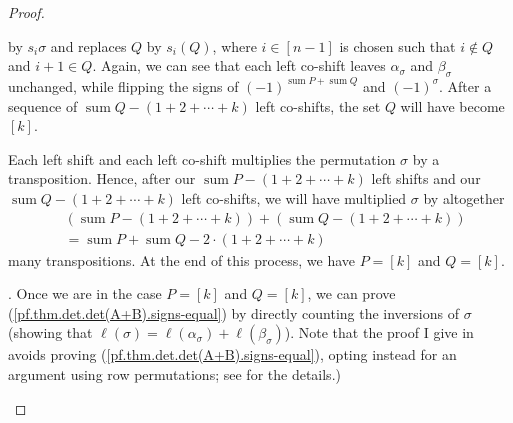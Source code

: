 \begin{proof}
\begin{fineprint}
{by $s_{i}\sigma$ and replaces $Q$ by $s_{i}\left(  Q\right)  $, where
$i\in\left[  n-1\right]  $ is chosen such that $i\notin Q$ and $i+1\in Q$.
Again, we can see that each left co-shift leaves $\alpha_{\sigma}$ and
$\beta_{\sigma}$ unchanged, while flipping the signs of $\left(  -1\right)
^{\operatorname*{sum}P+\operatorname*{sum}Q}$ and $\left(  -1\right)
^{\sigma}$. After a sequence of $\operatorname*{sum}Q-\left(  1+2+\cdots
+k\right)  $ left co-shifts, the set $Q$ will have become $\left[  k\right]
$.
\par
Each left shift and each left co-shift multiplies the permutation $\sigma$ by
a transposition. Hence, after our $\operatorname*{sum}P-\left(  1+2+\cdots
+k\right)  $ left shifts and our $\operatorname*{sum}Q-\left(  1+2+\cdots
+k\right)  $ left co-shifts, we will have multiplied $\sigma$ by altogether%
\begin{align*}
&  \left(  \operatorname*{sum}P-\left(  1+2+\cdots+k\right)  \right)  +\left(
\operatorname*{sum}Q-\left(  1+2+\cdots+k\right)  \right) \\
&  =\operatorname*{sum}P+\operatorname*{sum}Q-2\cdot\left(  1+2+\cdots
+k\right)
\end{align*}
many transpositions. At the end of this process, we have $P=\left[  k\right]
$ and $Q=\left[  k\right]  $.}. Once we are in the case $P=\left[  k\right]  $
and $Q=\left[  k\right]  $, we can prove
(\ref{pf.thm.det.det(A+B).signs-equal}) by directly counting the inversions of
$\sigma$ (showing that $\ell\left(  \sigma\right)  =\ell\left(  \alpha
_{\sigma}\right)  +\ell\left(  \beta_{\sigma}\right)  $). Note that the proof
I give in \cite[Theorem 6.160]{detnotes} avoids proving
(\ref{pf.thm.det.det(A+B).signs-equal}), opting instead for an argument using
row permutations; see \cite[solution to Exercise 6.44]{detnotes} for the details.)


\end{fineprint}
\end{proof}
